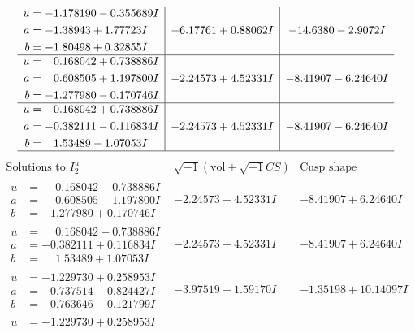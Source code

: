 \documentclass[1p]{elsarticle_modified}
\theoremstyle{definition}
\newcommand{\I}{\sqrt{-1}}
\begin{document}
$$\begin{array}{c|c|c}
\begin{aligned}
u &= -1.178190 - 0.355689 I \\
a &= -1.38943 + 1.77723 I \\
b &= -1.80498 + 0.32855 I\end{aligned}
 & -6.17761 + 0.88062 I & -14.6380 - 2.9072 I \\ \hline\begin{aligned}
u &= \phantom{-}0.168042 + 0.738886 I \\
a &= \phantom{-}0.608505 + 1.197800 I \\
b &= -1.277980 - 0.170746 I\end{aligned}
 & -2.24573 + 4.52331 I & -8.41907 - 6.24640 I \\ \hline\begin{aligned}
u &= \phantom{-}0.168042 + 0.738886 I \\
a &= -0.382111 - 0.116834 I \\
b &= \phantom{-}1.53489 - 1.07053 I\end{aligned}
 & -2.24573 + 4.52331 I & -8.41907 - 6.24640 I\\
 \hline 
 \end{array}$$\newpage$$\begin{array}{c|c|c}  
\text{Solutions to }I^u_{2}& \I (\text{vol} + \sqrt{-1}CS) & \text{Cusp shape}\\
 \hline 
\begin{aligned}
u &= \phantom{-}0.168042 - 0.738886 I \\
a &= \phantom{-}0.608505 - 1.197800 I \\
b &= -1.277980 + 0.170746 I\end{aligned}
 & -2.24573 - 4.52331 I & -8.41907 + 6.24640 I \\ \hline\begin{aligned}
u &= \phantom{-}0.168042 - 0.738886 I \\
a &= -0.382111 + 0.116834 I \\
b &= \phantom{-}1.53489 + 1.07053 I\end{aligned}
 & -2.24573 - 4.52331 I & -8.41907 + 6.24640 I \\ \hline\begin{aligned}
u &= -1.229730 + 0.258953 I \\
a &= -0.737514 - 0.824427 I \\
b &= -0.763646 - 0.121799 I\end{aligned}
 & -3.97519 - 1.59170 I & -1.35198 + 10.14097 I \\ \hline\begin{aligned}
u &= -1.229730 + 0.258953 I \\

\end{aligned}
\end{array}$$
\end{document}
